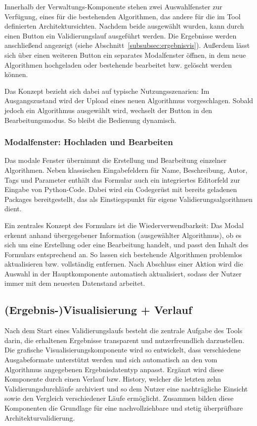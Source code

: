 Innerhalb der Verwaltungs-Komponente stehen zwei Auswahlfenster zur Verfügung, eines für die bestehenden Algorithmen, das andere für die im Tool definierten Architektursichten. Nachdem beide ausgewählt wurden, kann durch einen Button ein Validierungslauf ausgeführt werden. Die Ergebnisse werden anschließend angezeigt (siehe Abschnitt~\ref{subsubsec:ergebnisvis}). Außerdem lässt sich über einen weiteren Button ein separates Modalfenster öffnen, in dem neue Algorithmen hochgeladen oder bestehende bearbeitet bzw. gelöscht werden können.

Das Konzept bezieht sich dabei auf typische Nutzungsszenarien: Im Ausgangszustand wird der Upload eines neuen Algorithmus vorgeschlagen. Sobald jedoch ein Algorithmus ausgewählt wird, wechselt der Button in den Bearbeitungsmodus. So bleibt die Bedienung dynamisch.

\subsubsection*{Modalfenster: Hochladen und Bearbeiten}

Das modale Fenster übernimmt die Erstellung und Bearbeitung einzelner Algorithmen. Neben klassischen Eingabefeldern für Name, Beschreibung, Autor, Tags und Parameter enthält das Formular auch ein integriertes Editorfeld zur Eingabe von Python-Code. Dabei wird ein Codegerüst mit bereits geladenen Packages bereitgestellt, das als Einstiegspunkt für eigene Validierungsalgorithmen dient.

Ein zentrales Konzept des Formulars ist die Wiederverwendbarkeit: Das Modal erkennt anhand übergegebener Information (ausgewählter Algorithmus), ob es sich um eine Erstellung oder eine Bearbeitung handelt, und passt den Inhalt des Formulars entsprechend an. So lassen sich bestehende Algorithmen problemlos aktualisieren bzw. vollständig entfernen. Nach Abschluss einer Aktion wird die Auswahl in der Hauptkomponente automatisch aktualisiert, sodass der Nutzer immer mit dem neuesten Datenstand arbeitet.

\subsection{(Ergebnis-)Visualisierung + Verlauf}

Nach dem Start eines Validierungslaufs besteht die zentrale Aufgabe des Tools darin, die erhaltenen Ergebnisse transparent und nutzerfreundlich darzustellen. Die grafische Visualisierungskomponente wird so entwickelt, dass verschiedene Ausgabeformate unterstützt werden und sich automatisch an den vom Algorithmus angegebenen Ergebnisdatentyp anpasst. Ergänzt wird diese Komponente durch einen Verlauf bzw. History, welcher die letzten zehn Validierungsdurchläufe archiviert und so dem Nutzer eine nachträgliche Einsicht sowie den Vergleich verschiedener Läufe ermöglicht. Zusammen bilden diese Komponenten die Grundlage für eine nachvollziehbare und stetig überprüfbare Architekturvalidierung.

